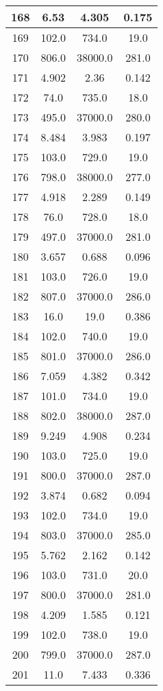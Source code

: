 \begin{table}[H]
\begin{tabular}{|c|c|c|c|}
\hline
168 & 6.53 & 4.305 & 0.175 \\
\hline
169 & 102.0 & 734.0 & 19.0 \\
\hline
170 & 806.0 & 38000.0 & 281.0 \\
\hline
171 & 4.902 & 2.36 & 0.142 \\
\hline
172 & 74.0 & 735.0 & 18.0 \\
\hline
173 & 495.0 & 37000.0 & 280.0 \\
\hline
174 & 8.484 & 3.983 & 0.197 \\
\hline
175 & 103.0 & 729.0 & 19.0 \\
\hline
176 & 798.0 & 38000.0 & 277.0 \\
\hline
177 & 4.918 & 2.289 & 0.149 \\
\hline
178 & 76.0 & 728.0 & 18.0 \\
\hline
179 & 497.0 & 37000.0 & 281.0 \\
\hline
180 & 3.657 & 0.688 & 0.096 \\
\hline
181 & 103.0 & 726.0 & 19.0 \\
\hline
182 & 807.0 & 37000.0 & 286.0 \\
\hline
183 & 16.0 & 19.0 & 0.386 \\
\hline
184 & 102.0 & 740.0 & 19.0 \\
\hline
185 & 801.0 & 37000.0 & 286.0 \\
\hline
186 & 7.059 & 4.382 & 0.342 \\
\hline
187 & 101.0 & 734.0 & 19.0 \\
\hline
188 & 802.0 & 38000.0 & 287.0 \\
\hline
189 & 9.249 & 4.908 & 0.234 \\
\hline
190 & 103.0 & 725.0 & 19.0 \\
\hline
191 & 800.0 & 37000.0 & 287.0 \\
\hline
192 & 3.874 & 0.682 & 0.094 \\
\hline
193 & 102.0 & 734.0 & 19.0 \\
\hline
194 & 803.0 & 37000.0 & 285.0 \\
\hline
195 & 5.762 & 2.162 & 0.142 \\
\hline
196 & 103.0 & 731.0 & 20.0 \\
\hline
197 & 800.0 & 37000.0 & 281.0 \\
\hline
198 & 4.209 & 1.585 & 0.121 \\
\hline
199 & 102.0 & 738.0 & 19.0 \\
\hline
200 & 799.0 & 37000.0 & 287.0 \\
\hline
201 & 11.0 & 7.433 & 0.336 \\

\end{tabular}
\end{table}
